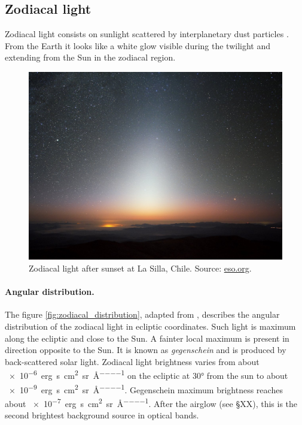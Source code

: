 \documentclass[a4paper, titlepage, 10pt]{book}
\begin{document}
\subsection{Zodiacal light}
Zodiacal light consists on sunlight scattered by interplanetary dust particles \cite{leinert1975zodiacal}. From the Earth it looks like a white glow visible during the twilight and extending from the Sun in the zodiacal region.
\begin{figure}
	\centering
	\includegraphics[width=.8\textwidth]{zodiacal_ima}
	\caption{Zodiacal light after sunset at La Silla, Chile. Source: \href{https://www.eso.org/public/images/zodiacal_beletsky_potw/}{eso.org}.\label{fig:zodiacal_ima}}
\end{figure}

\paragraph{Angular distribution.} The figure \ref{fig:zodiacal_distribution}, adapted from \cite{frey1974photometry}, describes the angular distribution of the zodiacal light in ecliptic coordinates. Such light is maximum along the ecliptic and close to the Sun. A fainter local maximum is present in direction opposite to the Sun. It is known as \emph{gegenschein} and is produced by back-scattered solar light. Zodiacal light brightness varies from about \SI{e-6}{erg\per\second \per\centi\metre\squared \per\steradian\per\angstrom} on the ecliptic at \ang{30} from the sun to about \SI{e-9}{erg\per\second \per\centi\metre\squared \per\steradian\per\angstrom}. Gegenschein maximum brightness reaches about \SI{e-7}{erg\per\second \per\centi\metre\squared \per\steradian\per\angstrom}. After the airglow (see \S XX), this is the second brightest background source in optical bands.
\end{document}
